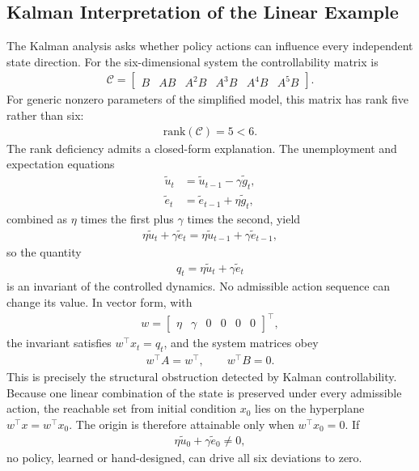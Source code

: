 \documentclass[11pt]{article}
\begin{document}
\subsection{Kalman Interpretation of the Linear Example}
The Kalman analysis asks whether policy actions can influence every independent state direction. For the six-dimensional system the controllability matrix is
\begin{align*}
    \mathcal{C} = \begin{bmatrix} B&AB&A^2B&A^3B&A^4B&A^5B \end{bmatrix}.
\end{align*}
For generic nonzero parameters of the simplified model, this matrix has rank five rather than six:
\begin{align}
    \mathrm{rank}(\mathcal{C}) = 5 < 6.
\end{align}
The rank deficiency admits a closed-form explanation. The unemployment and expectation equations
\begin{align*}
    \tilde u_t &= \tilde u_{t-1}-\gamma\tilde g_t,\\
    \tilde e_t &= \tilde e_{t-1}+\eta\tilde g_t,
\end{align*}
combined as $\eta$ times the first plus $\gamma$ times the second, yield
\begin{align*}
    \eta\tilde u_t+\gamma\tilde e_t = \eta\tilde u_{t-1}+\gamma\tilde e_{t-1},
\end{align*}
so the quantity
\begin{align}
    q_t = \eta\tilde u_t+\gamma\tilde e_t
\end{align}
is an invariant of the controlled dynamics. No admissible action sequence can change its value. In vector form, with
\begin{align*}
    w = \begin{bmatrix} \eta & \gamma & 0 & 0 & 0 & 0 \end{bmatrix}^\top,
\end{align*}
the invariant satisfies $w^\top x_t = q_t$, and the system matrices obey
\begin{align}
    w^\top A = w^\top, \qquad w^\top B = 0.
\end{align}
This is precisely the structural obstruction detected by Kalman controllability. Because one linear combination of the state is preserved under every admissible action, the reachable set from initial condition $x_0$ lies on the hyperplane $w^\top x = w^\top x_0$. The origin is therefore attainable only when $w^\top x_0 = 0$. If
\begin{align*}
    \eta\tilde u_0+\gamma\tilde e_0 \neq 0,
\end{align*}
no policy, learned or hand-designed, can drive all six deviations to zero.
\end{document}
